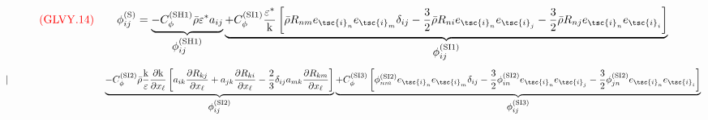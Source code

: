 \documentclass{article}
\begin{document}
\begin{equation}
{\color{red}{({\rm GLVY}.14)}}\qquad
\phi^{(\mathrm{\tiny S})}_{ij}=\underbrace{-C_\phi^{(\mathrm{\tiny SH1})}\bar\rho\varepsilon^* a_{ij}}_{\displaystyle\phi^{(\mathrm{\tiny SH1})}_{ij}}
                       \underbrace{+C_\phi^{(\mathrm{\tiny SI1})} \frac{\varepsilon^*}{\mathrm{k}}\left[\bar\rho R_{nm}e_{\tsc{i}_n}e_{\tsc{i}_m}\delta_{ij}
                                                                                                      -\frac{3}{2}\bar\rho R_{ni}e_{\tsc{i}_n}e_{\tsc{i}_j}
                                                                                                      -\frac{3}{2}\bar\rho R_{nj}e_{\tsc{i}_n}e_{\tsc{i}_i}\right]}_{\displaystyle\phi^{(\mathrm{\tiny SI1})}_{ij}}
\end{equation}
\begin{equation}
|\qquad\qquad\qquad\qquad\qquad
       \underbrace{-C_\phi^{(\mathrm{\tiny SI2})}\bar\rho\frac{\mathrm{k}}{\varepsilon}\frac{\partial\mathrm{k}}{\partial x_\ell}
                                               \left[                       a_{ik}\frac{\partial R_{kj}}{\partial x_\ell}
                                                                           +a_{jk}\frac{\partial R_{ki}}{\partial x_\ell}
                                                     -\frac{2}{3}\delta_{ij}a_{mk}\frac{\partial R_{km}}{\partial x_\ell}\right]}_{\displaystyle\phi^{(\mathrm{\tiny SI2})}_{ij}}
       \underbrace{+C_\phi^{(\mathrm{\tiny SI3})}\left[           \phi^{(\mathrm{\tiny SI2})}_{nm}e_{\tsc{i}_n}e_{\tsc{i}_m}\delta_{ij}
                                                      -\frac{3}{2}\phi^{(\mathrm{\tiny SI2})}_{in}e_{\tsc{i}_n}e_{\tsc{i}_j}
                                                      -\frac{3}{2}\phi^{(\mathrm{\tiny SI2})}_{jn}e_{\tsc{i}_n}e_{\tsc{i}_i}\right]}_{\displaystyle\phi^{(\mathrm{\tiny SI3})}_{ij}}
\end{equation}
\end{document}
